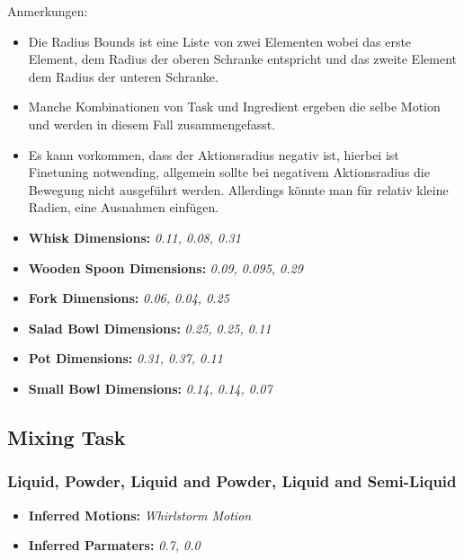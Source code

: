 Anmerkungen: 
\begin{itemize}
    \item Die Radius Bounds ist eine Liste von zwei Elementen wobei das erste Element, dem Radius der oberen Schranke entspricht und das zweite Element dem Radius der unteren Schranke.
    \item Manche Kombinationen von Task und Ingredient ergeben die selbe Motion und werden in diesem Fall zusammengefasst. 
    \item Es kann vorkommen, dass der Aktionsradius negativ ist, hierbei ist Finetuning notwending, allgemein sollte bei negativem Aktionsradius die Bewegung nicht ausgeführt werden. Allerdings könnte man für relativ kleine Radien, eine Ausnahmen einfügen.
    \item \textbf{Whisk Dimensions:} \textit{0.11, 0.08, 0.31}
    \item \textbf{Wooden Spoon Dimensions:} \textit{0.09, 0.095, 0.29}
    \item \textbf{Fork Dimensions:} \textit{0.06, 0.04, 0.25}
    \item \textbf{Salad Bowl Dimensions:} \textit{0.25, 0.25, 0.11}
    \item \textbf{Pot Dimensions:} \textit{0.31, 0.37, 0.11}
    \item \textbf{Small Bowl Dimensions:} \textit{0.14, 0.14, 0.07}
\end{itemize}

\subsection{Mixing Task}
\subsubsection{Liquid, Powder, Liquid and Powder, Liquid and Semi-Liquid}
\begin{itemize}
    \item \textbf{Inferred Motions:} \textit{Whirlstorm Motion}
    \item \textbf{Inferred Parmaters:} \textit{0.7, 0.0}
\end{itemize}

